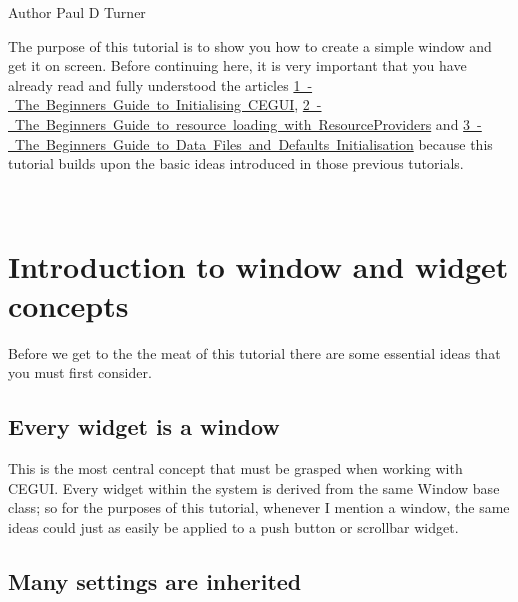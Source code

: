 \begin{DoxyAuthor}{Author}
Paul D Turner
\end{DoxyAuthor}
The purpose of this tutorial is to show you how to create a simple window and get it on screen. Before continuing here, it is very important that you have already read and fully understood the articles \mbox{\hyperlink{rendering_tutorial}{1 -\/ The Beginners Guide to Initialising C\+E\+G\+UI}}, \mbox{\hyperlink{resprov_tutorial}{2 -\/ The Beginners Guide to resource loading with Resource\+Providers}} and \mbox{\hyperlink{datafile_tutorial}{3 -\/ The Beginners Guide to Data Files and Defaults Initialisation}} because this tutorial builds upon the basic ideas introduced in those previous tutorials.

~\newline
 \hypertarget{window_tutorial_window_tutorial_intro}{}\section{Introduction to window and widget concepts}\label{window_tutorial_window_tutorial_intro}
Before we get to the the meat of this tutorial there are some essential ideas that you must first consider.\hypertarget{window_tutorial_window_tutorial_window_base}{}\subsection{Every widget is a window}\label{window_tutorial_window_tutorial_window_base}
This is the most central concept that must be grasped when working with C\+E\+G\+UI. Every widget within the system is derived from the same Window base class; so for the purposes of this tutorial, whenever I mention a window, the same ideas could just as easily be applied to a push button or scrollbar widget.\hypertarget{window_tutorial_window_tutorial_window_inheritance}{}\subsection{Many settings are inherited}\label{window_tutorial_window_tutorial_window_inheritance}
